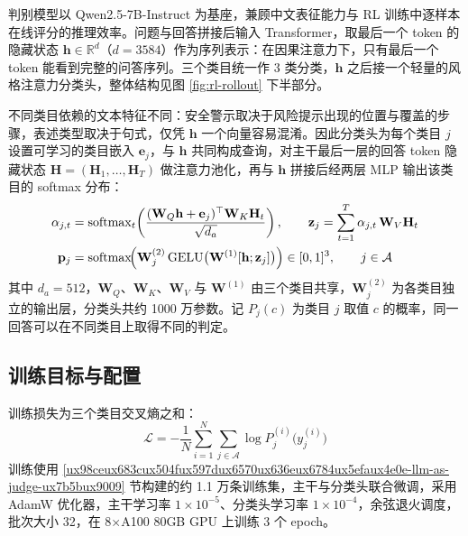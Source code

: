 \documentclass[fontset=fandol,type=master,campus=shenzhen,etitleauto=true]{hithesisbook}
\begin{document}
判别模型以 Qwen2.5-7B-Instruct 为基座，兼顾中文表征能力与 RL 训练中逐样本在线评分的推理效率。问题与回答拼接后输入 Transformer，取最后一个 token 的隐藏状态 $\mathbf{h} \in \mathbb{R}^{d}$（$d = 3584$）作为序列表示：在因果注意力下，只有最后一个 token 能看到完整的问答序列。三个类目统一作 3 类分类，$\mathbf{h}$ 之后接一个轻量的风格注意力分类头，整体结构见图 \ref{fig:rl-rollout} 下半部分。

不同类目依赖的文本特征不同：安全警示取决于风险提示出现的位置与覆盖的步骤，表述类型取决于句式，仅凭 $\mathbf{h}$ 一个向量容易混淆。因此分类头为每个类目 $j$ 设置可学习的类目嵌入 $\mathbf{e}_j$，与 $\mathbf{h}$ 共同构成查询，对主干最后一层的回答 token 隐藏状态 $\mathbf{H} = (\mathbf{H}_1, \dots, \mathbf{H}_T)$ 做注意力池化，再与 $\mathbf{h}$ 拼接后经两层 MLP 输出该类目的 softmax 分布：
\begin{equation}
\begin{aligned}
\alpha_{j,t} &= \operatorname{softmax}_t\!\left( \frac{(\mathbf{W}_Q\mathbf{h} + \mathbf{e}_j)^{\top} \mathbf{W}_K \mathbf{H}_t}{\sqrt{d_a}} \right), \qquad \mathbf{z}_j = \sum_{t=1}^{T} \alpha_{j,t}\, \mathbf{W}_V \mathbf{H}_t \\
\mathbf{p}_j &= \operatorname{softmax}\!\Bigl( \mathbf{W}^{(2)}_j \operatorname{GELU}\bigl( \mathbf{W}^{(1)} [\mathbf{h}; \mathbf{z}_j] \bigr) \Bigr) \in [0,1]^{3}, \qquad j \in \mathcal{A}
\end{aligned}
\end{equation}
其中 $d_a = 512$，$\mathbf{W}_Q$、$\mathbf{W}_K$、$\mathbf{W}_V$ 与 $\mathbf{W}^{(1)}$ 由三个类目共享，$\mathbf{W}^{(2)}_j$ 为各类目独立的输出层，分类头共约 1000 万参数。记 $P_j(c)$ 为类目 $j$ 取值 $c$ 的概率，同一回答可以在不同类目上取得不同的判定。

\subsection{训练目标与配置}\label{ux8badux7ec3ux76eeux6807ux4e0eux4f18ux5316ux914dux7f6e-1}

训练损失为三个类目交叉熵之和：
\begin{equation}
\mathcal{L} = -\frac{1}{N}\sum_{i=1}^{N} \sum_{j \in \mathcal{A}} \log P^{(i)}_j\bigl(y^{(i)}_j\bigr)
\end{equation}
训练使用 \ref{ux98ceux683cux504fux597dux6570ux636eux6784ux5efaux4e0e-llm-as-judge-ux7b5bux9009} 节构建的约 1.1 万条训练集，主干与分类头联合微调，采用 AdamW 优化器，主干学习率 $1 \times 10^{-5}$、分类头学习率 $1 \times 10^{-4}$，余弦退火调度，批次大小 32，在 8×A100 80GB GPU 上训练 3 个 epoch。
\end{document}
